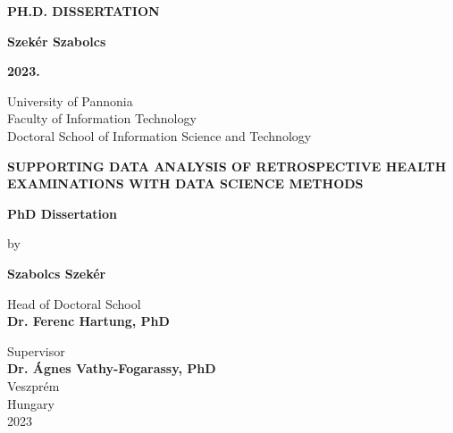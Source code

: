 \begin{center}

\vspace*{3cm}

{\LARGE\bf \MakeUppercase{Ph.D. Dissertation}}

\vspace*{5cm}

{\LARGE \bf Szekér Szabolcs}

\vspace*{12.4cm}

{\large \bf 2023.}

\end{center}

\cleardoublepage

\begin{center}

{\Large University of Pannonia}\\
{\Large Faculty of Information Technology}\\
{\Large Doctoral School of Information Science and Technology}\\

\vspace{3.5cm}



{\Large \bf \MakeUppercase{Supporting data analysis of retrospective health examinations with data science methods}}\\

\vspace{3.5cm}

{\Large \bf PhD Dissertation}

\vspace{0.3cm}

{\large by} \\

\vspace{0.2cm}

{\Large \bf Szabolcs Szekér}\\

\vspace{2.2cm}

{\large Head of Doctoral School} \\
{\large \bf Dr. Ferenc Hartung, PhD}\\

\vspace{0.8cm}

{\large Supervisor} \\
{\large \bf Dr. Ágnes Vathy-Fogarassy, PhD}\\

\vspace{2cm}
{\large Veszprém \\ Hungary \\ 2023}

\end{center}

